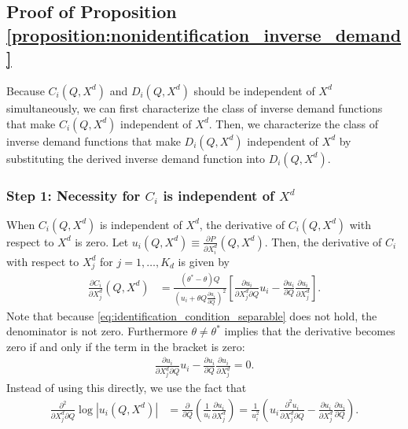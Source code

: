 \documentclass[11pt, a4paper]{article}
\theoremstyle{remark}
\begin{document}
\subsection{Proof of Proposition \ref{proposition:nonidentification_inverse_demand}}


Because $C_i(Q, X^{d})$ and $D_i(Q, X^{d})$ should be independent of $X^{d}$ simultaneously, we can first characterize the class of inverse demand functions that make $C_i(Q, X^{d})$ independent of $X^{d}$.
Then, we characterize the class of inverse demand functions that make $D_i(Q, X^{d})$ independent of $X^{d}$ by substituting the derived inverse demand function into $D_i(Q, X^{d})$.

\subsubsection*{Step 1: Necessity for $C_i$ is independent of $X^{d}$}
When $C_i(Q, X^{d})$ is independent of $X^{d}$, the derivative of $C_i(Q, X^{d})$ with respect to $X^{d}$ is zero.
Let $u_i(Q, X^{d}) \equiv \frac{\partial P}{\partial X^{d}_i}(Q, X^{d})$.
Then, the derivative of $C_i$ with respect to $X^{d}_j$ for $j = 1, \ldots, K_d$ is given by
\begin{align}
    \frac{\partial C_i}{\partial X^{d}_j}(Q, X^{d}) & = \frac{(\theta^{*} - \theta)Q }{\left(u_i + \theta Q \frac{\partial u_i}{\partial Q}\right)^2}\left[\frac{\partial u_i}{\partial X^{d}_j\partial Q} u_i - \frac{\partial u_i}{\partial Q} \frac{\partial u_i}{\partial X^{d}_j}\right].
\end{align}
Note that because \eqref{eq:identification_condition_separable} does not hold, the denominator is not zero.
Furthermore $\theta \ne \theta^{*}$ implies that the derivative becomes zero if and only if the term in the bracket is zero:
\begin{align}
    \frac{\partial u_i}{\partial X^{d}_j\partial Q} u_i - \frac{\partial u_i}{\partial Q} \frac{\partial u_i}{\partial X^{d}_j} = 0. \label{eq:identification_condition_separable_step1}
\end{align}
Instead of using this directly, we use the fact that
\begin{align}
    \frac{\partial^2 }{\partial X^{d}_j \partial Q}\log |u_i(Q, X^{d})| & = \frac{\partial }{\partial Q}\left(\frac{1}{u_i}\frac{\partial u_i}{\partial X^{d}_j}\right) = \frac{1}{u_i^2}\left(u_i\frac{\partial^2 u_i}{\partial X^{d}_j \partial Q} - \frac{\partial u_i}{\partial X^{d}_j}\frac{\partial u_i}{\partial Q}\right).
\end{align}
\end{document}
